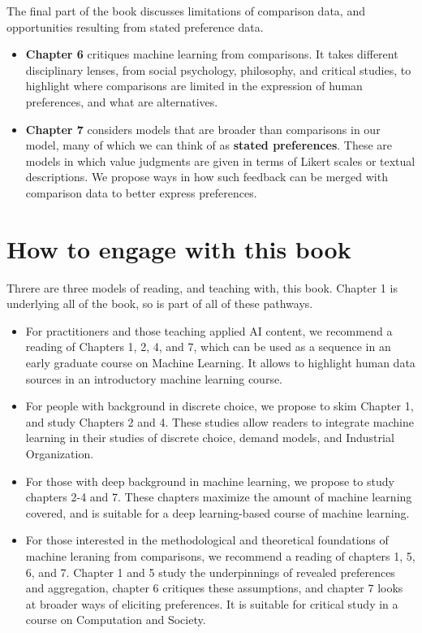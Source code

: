 \documentclass[
  letterpaper,
  numbers=noenddot,
  DIV=11]{scrreprt}
\theoremstyle{plain}
\theoremstyle{definition}
\theoremstyle{remark}
\begin{document}
The final part of the book discusses limitations of comparison data, and
opportunities resulting from stated preference data.

\begin{itemize}
\item
  \textbf{Chapter 6} critiques machine learning from comparisons. It
  takes different disciplinary lenses, from social psychology,
  philosophy, and critical studies, to highlight where comparisons are
  limited in the expression of human preferences, and what are
  alternatives.
\item
  \textbf{Chapter 7} considers models that are broader than comparisons
  in our model, many of which we can think of as \textbf{stated
  preferences}. These are models in which value judgments are given in
  terms of Likert scales or textual descriptions. We propose ways in how
  such feedback can be merged with comparison data to better express
  preferences.
\end{itemize}

\section*{How to engage with this
book}\label{how-to-engage-with-this-book}


Threre are three models of reading, and teaching with, this book.
Chapter 1 is underlying all of the book, so is part of all of these
pathways.

\begin{itemize}
\item
  For practitioners and those teaching applied AI content, we recommend
  a reading of Chapters 1, 2, 4, and 7, which can be used as a sequence
  in an early graduate course on Machine Learning. It allows to
  highlight human data sources in an introductory machine learning
  course.
\item
  For people with background in discrete choice, we propose to skim
  Chapter 1, and study Chapters 2 and 4. These studies allow readers to
  integrate machine learning in their studies of discrete choice, demand
  models, and Industrial Organization.
\item
  For those with deep background in machine learning, we propose to
  study chapters 2-4 and 7. These chapters maximize the amount of
  machine learning covered, and is suitable for a deep learning-based
  course of machine learning.
\item
  For those interested in the methodological and theoretical foundations
  of machine leraning from comparisons, we recommend a reading of
  chapters 1, 5, 6, and 7. Chapter 1 and 5 study the underpinnings of
  revealed preferences and aggregation, chapter 6 critiques these
  assumptions, and chapter 7 looks at broader ways of eliciting
  preferences. It is suitable for critical study in a course on
  Computation and Society.
\end{itemize}
\end{document}

